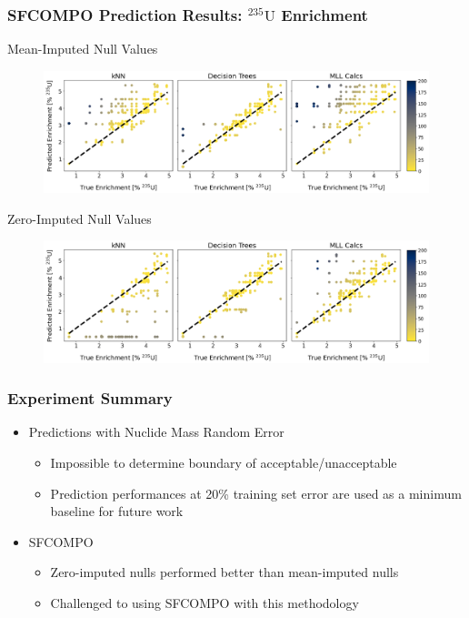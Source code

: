 \begin{frame}
  \frametitle{SFCOMPO Prediction Results: ${}^{235}\text{U}$ Enrichment}
  \vspace{-5pt}
  \begin{block}{Mean-Imputed Null Values}
    \begin{figure}
      \centering
      \includegraphics[height=0.35\textheight]{./figures/sfcompo_truey_vs_predy_impnull__enri.png}
    \end{figure}
  \end{block}
  \vspace{-5pt}
  \begin{block}{Zero-Imputed Null Values}
    \begin{figure}
      \centering
      \includegraphics[height=0.35\textheight]{./figures/sfcompo_truey_vs_predy_0null__enri.png}
    \end{figure}
  \end{block}
\end{frame}

\begin{frame}
  \frametitle{Experiment Summary}
  \begin{itemize}
  \item Predictions with Nuclide Mass Random Error
    \begin{itemize}
      \item Impossible to determine boundary of acceptable/unacceptable
      \item Prediction performances at 20\% training set error are used as a
      minimum baseline for future work 
    \end{itemize}
  \item SFCOMPO
    \begin{itemize}
      \item Zero-imputed nulls performed better than mean-imputed nulls
      \item Challenged to using SFCOMPO with this methodology
    \end{itemize}
  \end{itemize}
\end{frame}

